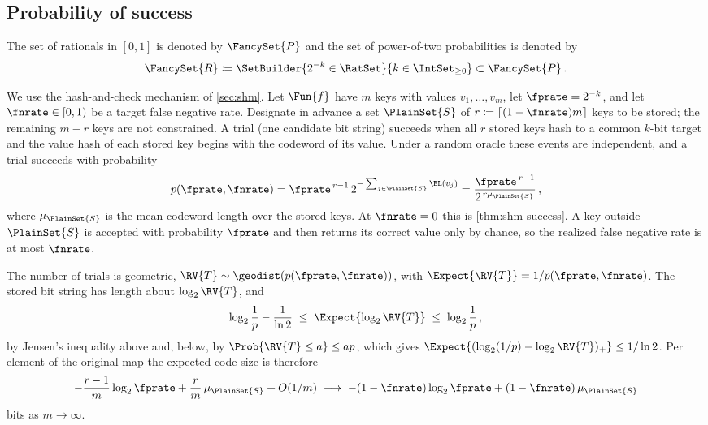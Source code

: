 \documentclass[ ../main.tex]{subfiles}
\begin{document}
\subsection{Probability of success}
\label{sec:prob-success}

The set of rationals in $[0,1]$ is denoted by $\FancySet{P}$ and the set of power-of-two probabilities is denoted by
\begin{equation}
	\FancySet{R} \coloneqq \SetBuilder{2^{-k} \in \RatSet}{k \in \IntSet_{\geq 0}} \subset \FancySet{P}\,.
\end{equation}

We use the hash-and-check mechanism of \cref{sec:shm}.
Let $\Fun{f}$ have $m$ keys with values $v_1,\ldots,v_m$, let $\fprate = 2^{-k}$,
and let $\fnrate \in [0,1)$ be a target false negative rate.
Designate in advance a set $\PlainSet{S}$ of
$r \coloneqq \lceil (1-\fnrate) m \rceil$ keys to be stored; the remaining
$m - r$ keys are not constrained.
A trial (one candidate bit string) succeeds when all $r$ stored keys hash to a
common $k$-bit target and the value hash of each stored key begins with the
codeword of its value.
Under a random oracle these events are independent, and a trial succeeds with
probability
\begin{equation}
\label{eq:prob-success}
	p(\fprate,\fnrate) = \fprate^{\,r-1}\, 2^{-\sum_{j \in \PlainSet{S}} \BL(v_j)}
	= \frac{\fprate^{\,r-1}}{2^{\,r \mu_{\PlainSet{S}}}}\,,
\end{equation}
where $\mu_{\PlainSet{S}}$ is the mean codeword length over the stored keys.
At $\fnrate = 0$ this is \cref{thm:shm-success}.
A key outside $\PlainSet{S}$ is accepted with probability $\fprate$ and then
returns its correct value only by chance, so the realized false negative rate
is at most $\fnrate$.

The number of trials is geometric, $\RV{T} \sim \geodist(p(\fprate,\fnrate))$,
with $\Expect{\RV{T}} = 1/p(\fprate,\fnrate)$.
The stored bit string has length about $\log_2 \RV{T}$, and
\begin{equation}
	\log_2 \frac{1}{p} - \frac{1}{\ln 2}
	\;\leq\; \Expect{\log_2 \RV{T}}
	\;\leq\; \log_2 \frac{1}{p}\,,
\end{equation}
by Jensen's inequality above and, below, by $\Prob{\RV{T} \leq a} \leq a p$,
which gives $\Expect{(\log_2(1/p) - \log_2 \RV{T})_+} \leq 1/\ln 2$.
Per element of the original map the expected code size is therefore
\begin{equation}
	-\frac{r-1}{m} \log_2 \fprate + \frac{r}{m}\,\mu_{\PlainSet{S}} + O(1/m)
	\;\longrightarrow\;
	-(1-\fnrate) \log_2 \fprate + (1-\fnrate)\,\mu_{\PlainSet{S}}
\end{equation}
bits as $m \to \infty$.
\end{document}
